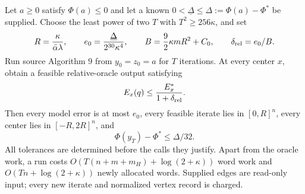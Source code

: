 \begin{theorem}
\label{thm:op3-explicit-capped-proximal-budget}
Let $a\geq0$ satisfy $\Phi(a)\leq0$ and let a known
$0<\underline\Delta\leq\Delta:=\Phi(a)-\Phi^*$ be supplied.
Choose the least power of two $T$ with $T^2\geq256\kappa$, and set
\begin{equation}
 R=\frac{\kappa}{\bar\alpha\lambda},\qquad
 e_0=\frac{\underline\Delta}{2^{30}\kappa^4},\qquad
 B=\frac92\kappa mR^2+C_0,\qquad \delta_{\rm rel}=e_0/B.
 \label{eq:op3-explicit-capped-proximal-policy}
\end{equation}
Run source Algorithm 9 from $y_0=z_0=a$ for $T$ iterations. At every
center $x$, obtain a feasible relative-oracle output satisfying
\begin{equation}
 E_x(q)\leq\frac{E_x^*}{1+\delta_{\rm rel}}.
 \label{eq:op3-capped-inner-relative-contract}
\end{equation}
Then every model error is at most $e_0$, every feasible iterate lies in
$[0,R]^n$, every center lies in $[-R,2R]^n$, and
\begin{equation}
 \Phi(y_T)-\Phi^*\leq\Delta/32.
 \label{eq:op3-capped-run-contraction}
\end{equation}
All tolerances are determined before the calls they justify. Apart from
the oracle work, a run costs $O(T(n+m+m_H)+\log(2+\kappa))$ word work
and $O(Tn+\log(2+\kappa))$ newly allocated words. Supplied edges are
read-only input; every new iterate and normalized vertex record is charged.
\end{theorem}
